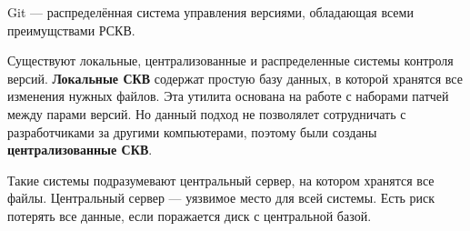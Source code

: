 \documentclass{article}
\begin{document}
Git — распределённая система управления версиями, обладающая всеми преимущствами РСКВ.

Существуют локальные, централизованные и распределенные системы контроля версий.
\textbf{Локальные СКВ} содержат простую базу данных, в которой хранятся все изменения нужных файлов. Эта утилита основана на работе с наборами патчей между парами версий. Но данный подход не позволялет сотрудничать с разработчиками за другими компьютерами, поэтому были созданы \textbf{централизованные СКВ}.

\begin{figure}[h]
\end{figure}

Такие системы подразумевают центральный сервер, на котором хранятся все файлы. 
Центральный сервер — уязвимое место для всей системы. Есть риск потерять все данные, если поражается диск с центральной базой.


\begin{figure}[h]
\end{figure}
\end{document}
